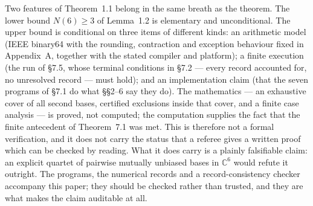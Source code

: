 Two features of Theorem~1.1 belong in the same breath as the theorem. The
lower bound $N(6)\ge 3$ of Lemma~1.2 is elementary and unconditional. The upper
bound is conditional on three items of different kinds: an arithmetic model
(IEEE binary64 with the rounding, contraction and exception behaviour fixed in
Appendix~A, together with the stated compiler and platform); a finite execution
(the run of \S7.5, whose terminal conditions in \S7.2 --- every record accounted
for, no unresolved record --- must hold); and an implementation claim (that the
seven programs of \S7.1 do what \S\S2--6 say they do). The mathematics --- an
exhaustive cover of all second bases, certified exclusions inside that cover,
and a finite case analysis --- is proved, not computed; the computation supplies
the fact that the finite antecedent of Theorem~7.1 was met. This is therefore
not a formal verification, and it does not carry the status that a referee gives
a written proof which can be checked by reading. What it does carry is a plainly
falsifiable claim: an explicit quartet of pairwise mutually unbiased bases in
$\mathbb{C}^6$ would refute it outright. The programs, the numerical records and
a record-consistency checker accompany this paper; they should be checked rather
than trusted, and they are what makes the claim auditable at all.
